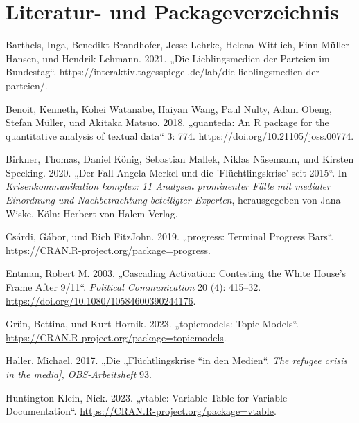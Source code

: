 \documentclass[
  11pt,
]{article}
\newlength{\cslhangindent}
\newlength{\cslentryspacingunit} %
\newenvironment{CSLReferences}[2] %
 {%
  \setlength{\parindent}{0pt}
  \ifodd #1
  \let\oldpar\par
  \def\par{\hangindent=\cslhangindent\oldpar}
  \fi
  \setlength{\parskip}{#2\cslentryspacingunit}
 }%
 {}
\begin{document}
\hypertarget{literatur--und-packageverzeichnis}{%
\section*{Literatur- und
Packageverzeichnis}\label{literatur--und-packageverzeichnis}}

\hypertarget{refs}{}
\begin{CSLReferences}{1}{0}
\leavevmode{}%
Barthels, Inga, Benedikt Brandhofer, Jesse Lehrke, Helena Wittlich, Finn
Müller-Hansen, und Hendrik Lehmann. 2021. {„Die {Lieblingsmedien} der
{Parteien} im {Bundestag}``}.
https://interaktiv.tagesspiegel.de/lab/die-lieblingsmedien-der-parteien/.

\leavevmode{}%
Benoit, Kenneth, Kohei Watanabe, Haiyan Wang, Paul Nulty, Adam Obeng,
Stefan Müller, und Akitaka Matsuo. 2018. {„quanteda: An R package for
the quantitative analysis of textual data``} 3: 774.
\url{https://doi.org/10.21105/joss.00774}.

\leavevmode{}%
Birkner, Thomas, Daniel König, Sebastian Mallek, Niklas Näsemann, und
Kirsten Specking. 2020. {„Der {Fall} {Angela} {Merkel} und die
'{Fl}{ü}chtlingskrise' seit 2015``}. In \emph{Krisenkommunikation
komplex: 11 {Analysen} prominenter {F}{ä}lle mit medialer {Einordnung}
und {Nachbetrachtung} beteiligter {Experten}}, herausgegeben von Jana
Wiske. K{ö}ln: Herbert von Halem Verlag.

\leavevmode{}%
Csárdi, Gábor, und Rich FitzJohn. 2019. {„progress: Terminal Progress
Bars``}. \url{https://CRAN.R-project.org/package=progress}.

\leavevmode{}%
Entman, Robert M. 2003. {„Cascading Activation: Contesting the White
House's Frame After 9/11``}. \emph{Political Communication} 20 (4):
415--32. \url{https://doi.org/10.1080/10584600390244176}.

\leavevmode{}%
Grün, Bettina, und Kurt Hornik. 2023. {„topicmodels: Topic Models``}.
\url{https://CRAN.R-project.org/package=topicmodels}.

\leavevmode{}%
Haller, Michael. 2017. {„Die „Fl{ü}chtlingskrise ``in den Medien``}.
\emph{The refugee crisis in the media{]}, OBS-Arbeitsheft} 93.

\leavevmode{}%
Huntington-Klein, Nick. 2023. {„vtable: Variable Table for Variable
Documentation``}. \url{https://CRAN.R-project.org/package=vtable}.


\end{CSLReferences}
\end{document}
